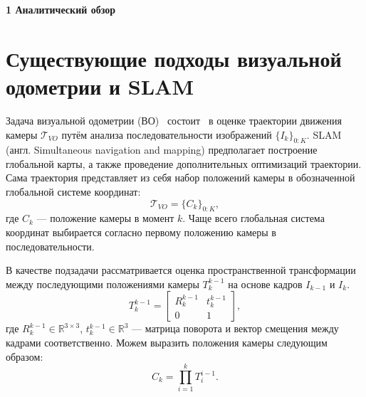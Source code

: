 \newpage
\begin{center}
  \textbf{\large 1 Аналитический обзор }
\end{center}


\section{Существующие подходы визуальной одометрии и SLAM}
Задача визуальной одометрии (ВО)~\cite{nister2004visual} состоит~\cite{aqel2016review}\cite{he2020review} 
в оценке траектории движения камеры 
$\mathcal{T}_{VO}$ путём анализа последовательности изображений 
$\{I_k\}_{0:K}$. SLAM (англ. Simultaneous navigation and mapping) предполагает 
построение глобальной карты, а также проведение дополнительных оптимизаций траектории.
Сама траектория представляет из себя набор положений камеры 
в обозначенной глобальной системе координат:
\begin{equation*}
    \mathcal{T}_{VO} = \{C_k\}_{0:K},
\end{equation*}
где $C_k$ --- положение камеры в момент $k$. Чаще всего глобальная 
система координат выбирается согласно первому положению камеры в 
последовательности.

В качестве подзадачи рассматривается оценка пространственной трансформации 
между последующими положениями камеры $T_k^{k-1}$ на основе кадров $I_{k-1}$ 
и $I_k$.
\begin{equation*}
    T_k^{k-1} = \begin{bmatrix}R_k^{k-1} & t_k^{k-1} \\ 0 & 1\end{bmatrix},
\end{equation*}
где $R_k^{k-1} \in \mathbb{R}^{3\times 3}$, $t_k^{k-1} \in \mathbb{R}^3$ --- 
матрица поворота и вектор смещения между кадрами соответственно. Можем выразить 
положения камеры следующим образом:
\begin{equation*}
    C_k = \prod\limits_{i=1}^k T_i^{i-1}.
\end{equation*}

